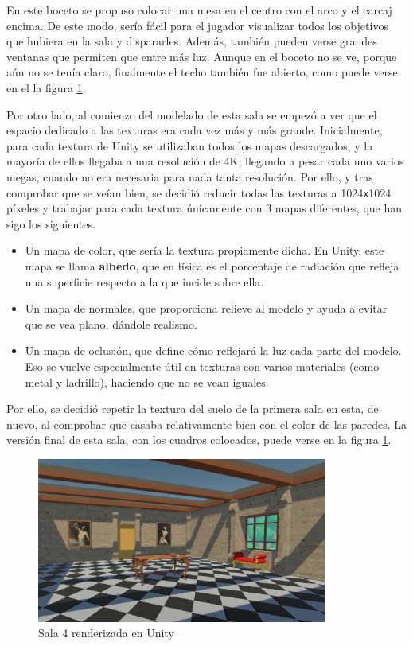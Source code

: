 En este boceto se propuso colocar una mesa en el centro con el arco y el carcaj encima. De este modo, sería fácil para el jugador visualizar todos los objetivos que hubiera en la sala y dispararles. Además, también pueden verse grandes ventanas que permiten que entre más luz. Aunque en el boceto no se ve, porque aún no se tenía claro, finalmente el techo también fue abierto, como puede verse en el la figura \ref{fig:unity-sala-4}.

Por otro lado, al comienzo del modelado de esta sala se empezó a ver que el espacio dedicado a las texturas era cada vez más y más grande. Inicialmente, para cada textura de Unity se utilizaban todos los mapas descargados, y la mayoría de ellos llegaba a una resolución de 4K, llegando a pesar cada uno varios megas, cuando no era necesaria para nada tanta resolución. Por ello, y tras comprobar que se veían bien, se decidió reducir todas las texturas a 1024\texttt{x}1024 píxeles y trabajar para cada textura únicamente con 3 mapas diferentes, que han sigo los siguientes.

\begin{itemize}
    \item Un mapa de color, que sería la textura propiamente dicha. En Unity, este mapa se llama \textbf{albedo}, que en física es el porcentaje de radiación que refleja una superficie respecto a la que incide sobre ella.
    \item Un mapa de normales, que proporciona relieve al modelo y ayuda a evitar que se vea plano, dándole realismo.
    \item Un mapa de oclusión, que define cómo reflejará la luz cada parte del modelo. Eso se vuelve especialmente útil en texturas con varios materiales (como metal y ladrillo), haciendo que no se vean iguales.
\end{itemize}

Por ello, se decidió repetir la textura del suelo de la primera sala en esta, de nuevo, al comprobar que casaba relativamente bien con el color de las paredes. La versión final de esta sala, con los cuadros colocados, puede verse en la figura \ref{fig:unity-sala-4}.

\begin{figure}[!h]
\begin{center}
\includegraphics[width=0.85\textwidth]{imagenes/7/salas-unity/unity-sala-4.png}
\caption{Sala 4 renderizada en Unity}
\label{fig:unity-sala-4}
\end{center}
\end{figure}

